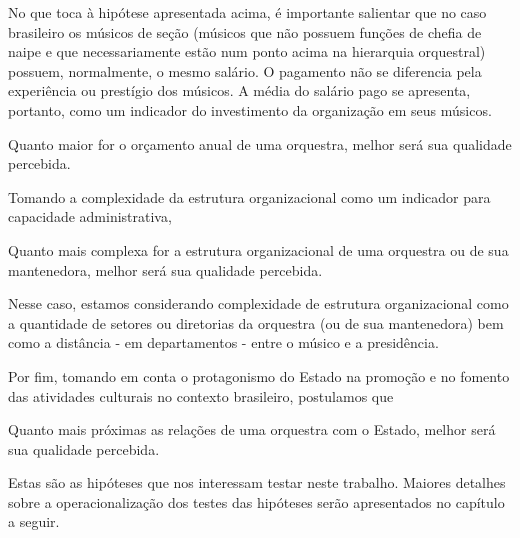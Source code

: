 \documentclass[a4paper, 12pt, openright, oneside, german, french, english, brazil]{abntex2}
\begin{document}
              No que toca à hipótese apresentada acima, é importante salientar que no caso brasileiro os músicos de seção (músicos que não possuem funções de chefia de naipe e que necessariamente estão num ponto acima na hierarquia orquestral) possuem, normalmente, o mesmo salário. O pagamento não se diferencia pela experiência ou prestígio dos músicos. A média do salário pago se apresenta, portanto, como um indicador do investimento da organização em seus músicos.
              
	
	\begin{hip}\label{hip:orcamento}
		Quanto maior for o orçamento anual de uma orquestra, melhor será sua qualidade percebida.
	\end{hip}
	


        Tomando a complexidade da estrutura organizacional como um indicador para capacidade administrativa, 
        
	\begin{hip}\label{hip:estruturacomplexa}
		Quanto mais complexa for a estrutura organizacional de uma orquestra ou de sua mantenedora, melhor será sua qualidade percebida.
              \end{hip}

              Nesse caso, estamos considerando complexidade de estrutura organizacional como a quantidade de setores ou diretorias da orquestra (ou de sua mantenedora) bem como a distância - em departamentos - entre o músico e a presidência.
	
	
	Por fim, tomando em conta o protagonismo do Estado na promoção e no fomento das atividades culturais no contexto brasileiro, postulamos que
	
	\begin{hip}\label{hip:proxestado}
		Quanto mais próximas as relações de uma orquestra com o Estado, melhor será sua qualidade percebida.
	\end{hip}


        Estas são as hipóteses que nos interessam testar neste trabalho. Maiores detalhes sobre a operacionalização dos testes das hipóteses serão apresentados no capítulo a seguir.
\end{document}
